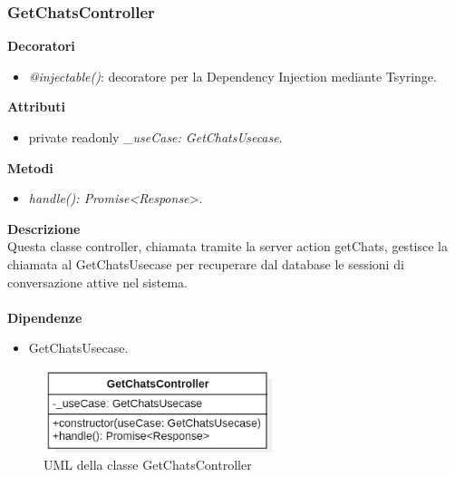 \subsubsection{GetChatsController}
\textbf{Decoratori}
\begin{itemize}
    \item \textit{@injectable()}: decoratore per la Dependency Injection mediante Tsyringe.
\end{itemize}
\textbf{Attributi}
\begin{itemize}
    \item private readonly \textit{\_useCase: GetChatsUsecase}.
\end{itemize}
\textbf{Metodi}
\begin{itemize}
    \item \textit{handle(): Promise<Response}>.
\end{itemize}
\textbf{Descrizione}\\
Questa classe controller, chiamata tramite la server action getChats, gestisce la chiamata al GetChatsUsecase per recuperare dal database le sessioni di conversazione attive nel sistema.\\ \\
\textbf{Dipendenze}
\begin{itemize}
    \item GetChatsUsecase.
\end{itemize}

\begin{figure}[h!]
    \centering  
    \includegraphics[width=0.6\textwidth]{GetChatsController.png}
    \caption{UML della classe GetChatsController}
\end{figure}

\newpage
